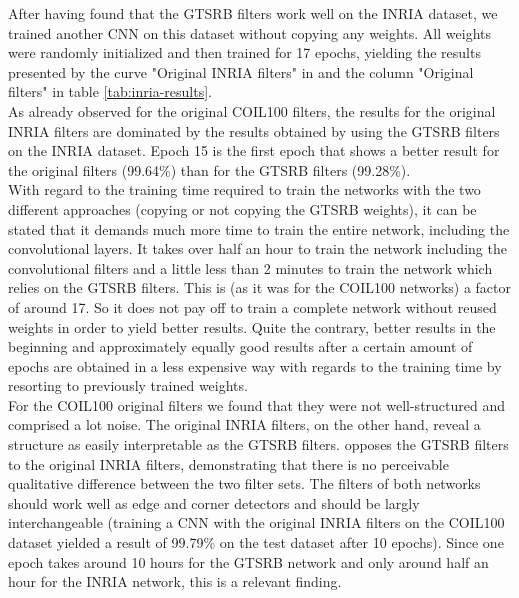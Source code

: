 \documentclass[11pt, a4paper]{article}
\begin{document}
After having found that the GTSRB filters work well on the INRIA dataset, we trained another CNN on this dataset without copying any weights. All weights were randomly initialized and then trained for 17 epochs, yielding the results presented by the curve "Original INRIA filters" in  and the column "Original filters" in table \ref{tab:inria-results}.\\
As already observed for the original COIL100 filters, the results for the original INRIA filters are dominated by the results obtained by using the GTSRB filters on the INRIA dataset. Epoch 15 is the first epoch that shows a better result for the original filters (99.64\%) than for the GTSRB filters (99.28\%).\\
With regard to the training time required to train the networks with the two different approaches (copying or not copying the GTSRB weights), it can be stated that it demands much more time to train the entire network, including the convolutional layers. It takes over half an hour to train the network including the convolutional filters and a little less than 2 minutes to train the network which relies on the GTSRB filters. This is (as it was for the COIL100 networks) a factor of around 17. So it does not pay off to train a complete network without reused weights in order to yield better results. Quite the contrary, better results in the beginning and approximately equally good results after a certain amount of epochs are obtained in a less expensive way with regards to the training time by resorting to previously trained weights.\\
For the COIL100 original filters we found that they were not well-structured and comprised a lot noise. The original INRIA filters, on the other hand, reveal a structure as easily interpretable as the GTSRB filters.  opposes the GTSRB filters to the original INRIA filters, demonstrating that there is no perceivable qualitative difference between the two filter sets. The filters of both networks should work well as edge and corner detectors and should be largly interchangeable (training a CNN with the original INRIA filters on the COIL100 dataset yielded a result of 99.79\% on the test dataset after 10 epochs). Since one epoch takes around 10 hours for the GTSRB network and only around half an hour for the INRIA network, this is a relevant finding.
\end{document}
